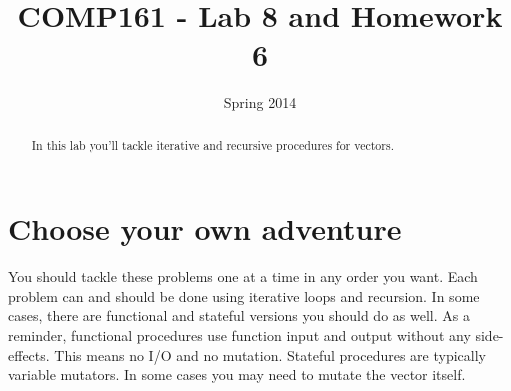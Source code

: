 \documentclass[]{tufte-handout}
\title{COMP161 - Lab 8 and Homework 6}
\author{}
\date{Spring 2014}
\begin{document}
\maketitle

\begin{abstract}
In this lab you'll tackle iterative and recursive procedures for vectors.
\end{abstract}

\section{Choose your own adventure}

You should tackle these problems one at a time in any order you want.  Each problem can and should be done using iterative loops and recursion. In some cases, there are functional and stateful versions you should do as well.  As a reminder, functional procedures use function input and output without any side-effects. This means no I/O and no mutation. Stateful procedures are typically variable mutators.  In some cases you may need to mutate the vector itself.
\end{document}
